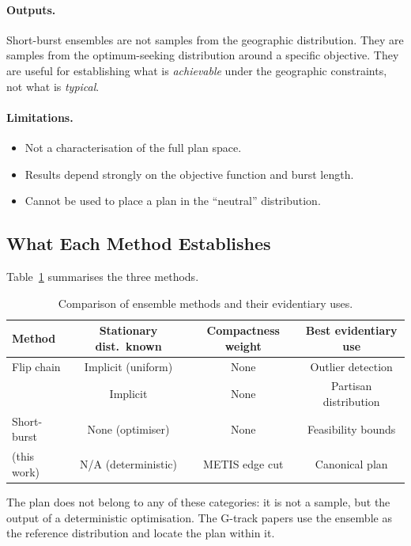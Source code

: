 \paragraph{Outputs.} Short-burst ensembles are not samples from the
geographic distribution.  They are samples from the optimum-seeking
distribution around a specific objective.  They are useful for establishing
what is \emph{achievable} under the geographic constraints, not what is
\emph{typical}.

\paragraph{Limitations.}
\begin{itemize}
  \item Not a characterisation of the full plan space.
  \item Results depend strongly on the objective function and burst length.
  \item Cannot be used to place a plan in the ``neutral'' distribution.
\end{itemize}

\subsection{What Each Method Establishes}

Table~\ref{tab:method-comparison} summarises the three methods.

\begin{table}[h]
\centering
\caption{Comparison of ensemble methods and their evidentiary uses.}
\label{tab:method-comparison}
\begin{tabular}{lccc}
\toprule
Method & Stationary dist.\ known & Compactness weight & Best evidentiary use \\
\midrule
Flip chain       & Implicit (uniform) & None & Outlier detection \\
\recom{}         & Implicit           & None & Partisan distribution \\
Short-burst      & None (optimiser)   & None & Feasibility bounds \\
\ar{} (this work)& N/A (deterministic)& METIS edge cut & Canonical plan \\
\bottomrule
\end{tabular}
\end{table}

The \ar{} plan does not belong to any of these categories: it is not a
sample, but the output of a deterministic optimisation.  The G-track papers
use the \recom{} ensemble as the reference distribution and locate the
\ar{} plan within it.
